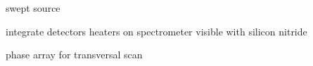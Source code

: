 \documentclass[12pt,twoside,english]{book}
\renewcommand{\~}{\perispomeni}%
\providecommand{\tabularnewline}{\\}
\numberwithin{equation}{section}
\numberwithin{figure}{section}
\begin{document}

swept source

integrate detectors
heaters on spectrometer
visible with silicon nitride

phase array for transversal scan


\printbibliography
{}
\appendix
%
%
%
%
%
\end{document}
